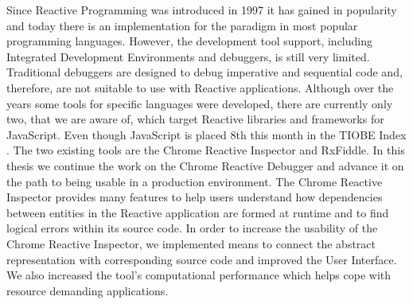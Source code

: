 Since Reactive Programming was introduced in 1997 it has gained in popularity and today there is an implementation for the paradigm in most popular programming languages. However, the development tool support, including Integrated Development Environments and debuggers, is still very limited. Traditional debuggers are designed to debug imperative and sequential code and, therefore, are not suitable to use with Reactive applications. Although over the years some tools for specific languages were developed, there are currently only two, that we are aware of, which target Reactive libraries and frameworks for JavaScript. Even though JavaScript is placed 8th this month in the TIOBE Index \cite{LanguageIndex}. The two existing tools are the Chrome Reactive Inspector and RxFiddle.
In this thesis we continue the work on the Chrome Reactive Debugger and advance it on the path to being usable in a production environment. The Chrome Reactive Inspector provides many features to help users understand how dependencies between entities in the Reactive application are formed at runtime and to find logical errors within its source code. In order to increase the usability of the Chrome Reactive Inspector, we implemented means to connect the abstract representation with corresponding source code and improved the User Interface. We also increased the tool's computational performance which helps cope with resource demanding applications.